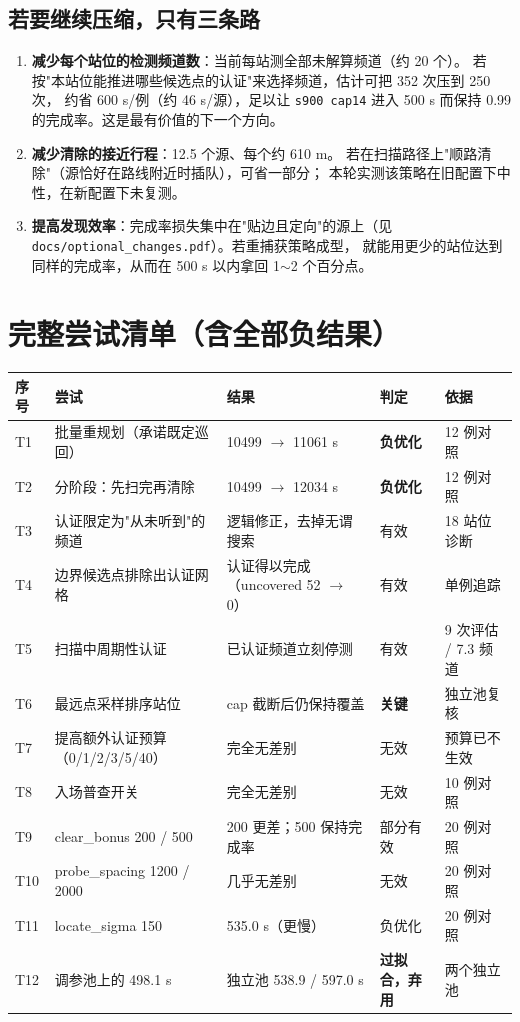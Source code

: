 \subsection{若要继续压缩，只有三条路}

\begin{enumerate}[leftmargin=1.8em]
  \item \textbf{减少每个站位的检测频道数}：当前每站测全部未解算频道（约 20 个）。
        若按"本站位能推进哪些候选点的认证"来选择频道，估计可把 352 次压到 250 次，
        约省 600 s/例（约 46 s/源），足以让 \texttt{s900 cap14} 进入 500 s
        而保持 0.99 的完成率。这是最有价值的下一个方向。
  \item \textbf{减少清除的接近行程}：12.5 个源、每个约 610 m。
        若在扫描路径上"顺路清除"（源恰好在路线附近时插队），可省一部分；
        本轮实测该策略在旧配置下中性，在新配置下未复测。
  \item \textbf{提高发现效率}：完成率损失集中在"贴边且定向"的源上（见
        \texttt{docs/optional\_changes.pdf}）。若重捕获策略成型，
        就能用更少的站位达到同样的完成率，从而在 500 s 以内拿回 1$\sim$2 个百分点。
\end{enumerate}

\section{完整尝试清单（含全部负结果）}

\footnotesize
\begin{longtable}{p{0.5cm}p{3.4cm}p{2.8cm}p{2.4cm}p{2.9cm}}
\toprule
序号 & 尝试 & 结果 & 判定 & 依据 \\ \midrule
\endhead
T1 & 批量重规划（承诺既定巡回） & 10499 $\to$ 11061 s & \textbf{负优化} & 12 例对照 \\
T2 & 分阶段：先扫完再清除 & 10499 $\to$ 12034 s & \textbf{负优化} & 12 例对照 \\
T3 & 认证限定为"从未听到"的频道 & 逻辑修正，去掉无谓搜索 & 有效 & 18 站位诊断 \\
T4 & 边界候选点排除出认证网格 & 认证得以完成（uncovered 52 $\to$ 0） & 有效 & 单例追踪 \\
T5 & 扫描中周期性认证 & 已认证频道立刻停测 & 有效 & 9 次评估 / 7.3 频道 \\
T6 & 最远点采样排序站位 & cap 截断后仍保持覆盖 & \textbf{关键} & 独立池复核 \\
T7 & 提高额外认证预算（0/1/2/3/5/40） & 完全无差别 & 无效 & 预算已不生效 \\
T8 & 入场普查开关 & 完全无差别 & 无效 & 10 例对照 \\
T9 & clear\_bonus 200 / 500 & 200 更差；500 保持完成率 & 部分有效 & 20 例对照 \\
T10 & probe\_spacing 1200 / 2000 & 几乎无差别 & 无效 & 20 例对照 \\
T11 & locate\_sigma 150 & 535.0 s（更慢） & 负优化 & 20 例对照 \\
T12 & 调参池上的 498.1 s & 独立池 538.9 / 597.0 s & \textbf{过拟合，弃用} & 两个独立池 \\
\bottomrule
\end{longtable}

